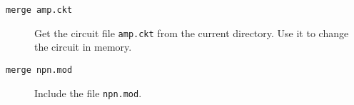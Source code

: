 \begin{description}

\item[{\tt merge amp.ckt}] Get the circuit file {\tt amp.ckt} from
the current directory.  Use it to change the circuit in memory.

\item[{\tt merge npn.mod}] Include the file {\tt npn.mod}.

\end{description}
